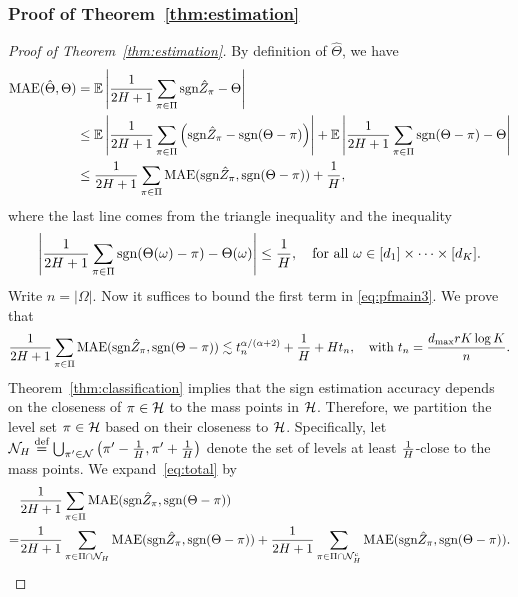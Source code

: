 \documentclass[11pt]{article}
\theoremstyle{plain}
\theoremstyle{definition}
\def\sign{\textup{sgn}}
\begin{document}
\subsubsection{Proof of Theorem~\ref{thm:estimation}}
\begin{proof}[Proof of Theorem~\ref{thm:estimation}]
By definition of $\hat\Theta$, we have
\begin{align}\label{eq:pfmain3}\nonumber
\text{MAE}(\hat\Theta,\Theta) &= \mathbb{E}\left|\frac{1}{2H+1}\sum_{\pi\in\Pi}\sign\hat Z_\pi-\Theta\right|\\\nonumber
&\leq \mathbb{E}\left|\frac{1}{2H+1}\sum_{\pi\in\Pi}\left(\sign\hat Z_\pi-\sign(\Theta-\pi)\right)\right|+\mathbb{E}\left|\frac{1}{2H+1}\sum_{\pi\in\Pi}\sign(\Theta-\pi)-\Theta\right|\\&
\leq \frac{1}{2H+1}\sum_{\pi\in\Pi}\text{MAE}(\sign\hat Z_\pi,\sign(\Theta-\pi))+\frac{1}{H},
\end{align}
where the last line comes  from the triangle inequality and the inequality
\begin{equation}
\left|\frac{1}{2H+1}\sum_{\pi\in\Pi}\sign(\Theta(\omega)-\pi)-\Theta(\omega)\right|\leq \frac{1}{H},\quad\text{for all } \omega\in[d_1]\times\cdots\times[d_K] .
\end{equation}
Write $n=|\Omega|$. Now it suffices to bound  the first term in \eqref{eq:pfmain3}.  We prove that 
\begin{equation}\label{eq:total}
{1\over 2H+1}\sum_{\pi \in \Pi} \textup{MAE}(\sign \hat Z_\pi, \sign (\Theta-\pi)) \lesssim  t_n^{\alpha/(\alpha+2)}+{1\over H}+ H t_n, \quad \text{with } t_n={d_{\max}rK\log K\over n}.
\end{equation}
Theorem~\ref{thm:classification} implies that the  sign estimation accuracy depends on the closeness of $\pi\in \mathcal{H}$ to the mass points in $\mathcal{H}$. Therefore, we partition the level set $\pi \in \mathcal{H}$ based on their closeness to $\mathcal{H}$. Specifically, let $\mathcal{N}_H \stackrel{\text{def}}{=}\bigcup_{\pi'\in\mathcal{N}}\left(\pi'-\frac{1}{H},\pi'+\frac{1}{H}\right)$ denote the set of levels at least $1\over H$-close to the mass points. We expand~\eqref{eq:total} by
\begin{align}\label{eq:twobounds}
&{1\over 2H+1}\sum_{\pi \in \Pi} \textup{MAE}(\sign \hat Z_\pi, \sign (\Theta-\pi))\notag \\
=&{1\over 2H+1}\sum_{\pi \in \Pi\cap \tN_H} \textup{MAE}(\sign \hat Z_\pi, \sign (\Theta-\pi))+{1\over 2H+1}\sum_{\pi \in \Pi\cap \tN_H^c} \textup{MAE}(\sign \hat Z_\pi, \sign (\Theta-\pi)).
\end{align}

\end{proof}
\end{document}
